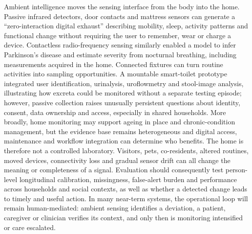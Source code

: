 \documentclass[12pt,a4paper]{article}
\begin{document}
Ambient intelligence moves the sensing interface from the body into the home. Passive infrared detectors, door contacts and mattress sensors can generate a ``zero-interaction digital exhaust'' describing mobility, sleep, activity patterns and functional change without requiring the user to remember, wear or charge a device. Contactless radio-frequency sensing similarly enabled a model to infer Parkinson's disease and estimate severity from nocturnal breathing, including measurements acquired in the home. Connected fixtures can turn routine activities into sampling opportunities. A mountable smart-toilet prototype integrated user identification, urinalysis, uroflowmetry and stool-image analysis, illustrating how excreta could be monitored without a separate testing episode; however, passive collection raises unusually persistent questions about identity, consent, data ownership and access, especially in shared households. More broadly, home monitoring may support ageing in place and chronic-condition management, but the evidence base remains heterogeneous and digital access, maintenance and workflow integration can determine who benefits. The home is therefore not a controlled laboratory. Visitors, pets, co-residents, altered routines, moved devices, connectivity loss and gradual sensor drift can all change the meaning or completeness of a signal. Evaluation should consequently test person-level longitudinal calibration, missingness, false-alert burden and performance across households and social contexts, as well as whether a detected change leads to timely and useful action. In many near-term systems, the operational loop will remain human-mediated: ambient sensing identifies a deviation, a patient, caregiver or clinician verifies its context, and only then is monitoring intensified or care escalated.
\end{document}

